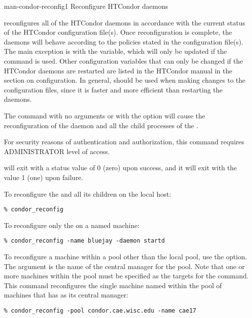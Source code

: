 \begin{ManPage}{}{man-condor-reconfig}{1}
{Reconfigure HTCondor daemons}

\Synopsis {}
\ToolArgsBase

\ToolDebugOption
\ToolWhere
\ToolArgsAffect

\Description 

 reconfigures all of the HTCondor daemons in accordance with 
the current
status of the HTCondor configuration file(s).  
Once reconfiguration is complete, the daemons will behave according to
the policies stated in the configuration file(s).
The main exception is with the  variable,
which will only be
updated if the  command is used.  
Other configuration variables that can only be changed
if the HTCondor daemons are restarted are listed in
the HTCondor manual in the section on configuration.
In general,  should be used when making changes to
the configuration files, since it is faster and more efficient than
restarting the daemons.

The command 
with no arguments or with the  option 
will cause the reconfiguration of the 
daemon and all the child processes of the .

For security reasons of authentication and authorization,
this command requires ADMINISTRATOR level of access.

\begin{Options}
    \ToolArgsBaseDesc
    \ToolDebugDesc
    \ToolArgsLocateDesc
    \ToolArgsAffectDesc
\end{Options}

\ExitStatus

 will exit with a status value of 0 (zero) upon success,
and it will exit with the value 1 (one) upon failure.

\Examples
To reconfigure the  and all its children
on the local host:
\begin{verbatim}
% condor_reconfig
\end{verbatim}

To reconfigure only the  on a named machine:
\begin{verbatim}
% condor_reconfig -name bluejay -daemon startd
\end{verbatim}

To reconfigure a machine within a pool
other than the local pool, use the  option.
The argument is the name of the central manager for the pool.
Note that one or more machines within the pool must be
specified as the targets for the command.
This command reconfigures
the single machine named  within the
pool of machines that has  as
its central manager:
\begin{verbatim}
% condor_reconfig -pool condor.cae.wisc.edu -name cae17
\end{verbatim}

\end{ManPage}
